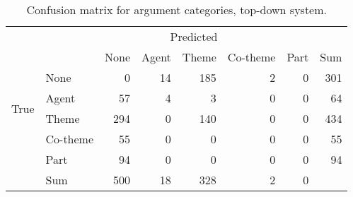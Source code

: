 \begin{table}
\begin{center}
\begin{tabular}{ | l | l | r | r | r | r | r | r | }
	\hline
	\multirow{8}{*}{True} & \multicolumn{7}{c|}{Predicted} \\ \cline{1-8}
	&\cellcolor{gray} & None & Agent & Theme & Co-theme & Part & Sum \\ \cline{2-8}
	&None & \cellcolor{g} 0 & 14 & 185 & 2 & 0 &  301 \\
	&Agent & 57 & \cellcolor{g} 4 & 3 & 0 & 0 & 64 \\
	&Theme & 294 & 0 & \cellcolor{g} 140 & 0 & 0 & 434 \\
	&Co-theme & 55 & 0 & 0 & \cellcolor{g} 0 & 0 & 55 \\
	&Part & 94 & 0 & 0 & 0 & \cellcolor{g} 0 & 94 \\ \hline	
	& Sum & 500 & 18 & 328 & 2 & 0 & \\ \hline
\end{tabular}
\end{center}
\caption{Confusion matrix for argument categories, top-down system.}
\label{pms_argument_conf}
\end{table}
